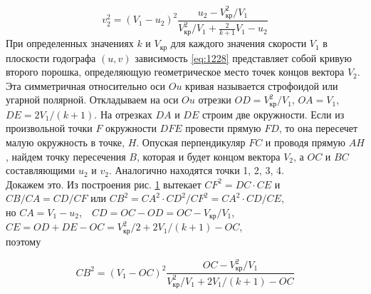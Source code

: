 \documentclass[specialist, subf, href, colorlinks=true, 14pt, final]{disser}
\theoremstyle{definition}
\begin{document}
\addtocounter{equation}{1}
\begin{equation}\label{eq:1228}
  v_{2}^{2} = (V_{1}-u_{2})^{2} \frac{u_{2} - V_{\text{кр}}^{2}/V_{1}}{V_{\text{кр}}^{2}/V_{1} + \frac{2}{k+1}V_{1} - u_{2}}
  \tag{28}
\end{equation}
При определенных значениях $k$ и $V_{\text{кр}}$ для каждого значения скорости $V_1$ в плоскости годографа $(u, v)$ зависимость \eqref{eq:1228} представляет собой кривую второго порошка, определяющую геометрическое место точек концов вектора $V_2$. Эта симметричная относительно оси $Ou$ кривая называется строфоидой или угарной полярной. Откладываем на оси $Ou$ отрезки $OD = V_{\text{кр}}^{2}/V_{1}$, $OA = V_1$, $DE = 2V_{1}/(k+1)$. На отрезках $DA$ и $DE$ строим две окружности. Если из произвольной точки $F$ окружности $DFE$ провести прямую $FD$, то она пересечет малую окружность в точке, $H$. Опуская перпендикуляр $FC$ и проводя прямую $AH$, найдем точку  пересечения $B$, которая и будет концом вектора $V_2$, а $OC$ и $BC$ составляющими $u_2$ и $v_2$. Аналогично находятся точки 1, 2, 3, 4.\\
Докажем это. Из построения рис. \ref{1-2-4} вытекает $CF^{2} = DC\cdot CE$ и\\
$CB/CA = CD/CF$ или $CB^{2} = CA^{2}\cdot CD^{2} / CF^{2} = CA^{2}\cdot CD/CE$,\\
но $CA = V_{1}-u_{2}$,\ \ $CD=OC-OD=OC-V_{\text{кр}}/V_{1}$,\\
$CE=OD+DE-OC = V_{\text{кр}}^{2}/2 + 2V_{1}/(k+1)-OC$,\\
поэтому
\addtocounter{equation}{1}
\begin{equation}\label{eq:1228d}
  CB^{2} = (V_{1}-OC)^{2} \frac{OC - V_{\text{кр}}^{2}/V_{1}}{V_{\text{кр}}^{2}/V_{1} + 2V_{1}/(k+1) - OC}
  \tag{28$'$}
\end{equation}

\begin{figure}[!htp]
  \caption{}
  \label{1-2-4}
\end{figure}
\end{document}
